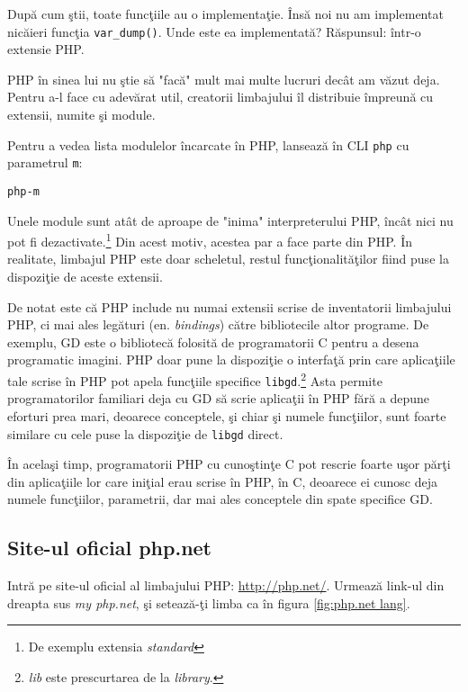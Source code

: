 După cum ştii, toate funcţiile au o implementaţie. Însă
noi nu am implementat nicăieri funcţia \texttt{var\_dump()}. Unde
este ea implementată? Răspunsul: într-o extensie PHP.

PHP în sinea lui nu ştie să "facă" mult mai multe lucruri decât
am văzut deja. Pentru a-l face cu adevărat util, creatorii
limbajului îl distribuie împreună cu extensii, numite şi module.

Pentru a vedea lista modulelor încarcate în PHP, lansează
în CLI \texttt{php} cu parametrul \texttt{\-m}:
\begin{alltt}
php -m\Return
\end{alltt}
Unele module sunt atât de aproape de "inima" interpreterului
PHP, încât nici nu pot fi dezactivate.\footnote{De exemplu
extensia \textit{standard}} Din acest motiv, acestea
par a face parte din PHP. În realitate, limbajul PHP
este doar scheletul, restul funcţionalităţilor
fiind puse la dispoziţie de aceste extensii.

De notat este că PHP include nu numai extensii scrise
de inventatorii limbajului PHP, ci mai ales legături
(en. \textsl{bindings})
către bibliotecile altor programe. De exemplu,
GD este o bibliotecă folosită de programatorii C
pentru a desena programatic imagini. PHP doar
pune la dispoziţie o interfaţă prin care aplicaţiile
tale scrise în PHP pot apela funcţiile specifice \texttt{libgd}.\footnote{\textit{lib}
este prescurtarea de la \textit{library}.}
Asta permite programatorilor familiari deja cu GD
să scrie aplicaţii în PHP fără a depune eforturi
prea mari, deoarece conceptele, şi chiar şi numele funcţiilor,
sunt foarte similare cu cele puse la dispoziţie de \texttt{libgd}
direct.

În acelaşi timp, programatorii PHP cu cunoştinţe C
pot rescrie foarte uşor părţi din aplicaţiile lor
care iniţial erau scrise în PHP, în C, deoarece
ei cunosc deja numele funcţiilor, parametrii,
dar mai ales conceptele din spate specifice 
GD.


\subsection{Site-ul oficial php.net}
Intră pe site-ul oficial al limbajului PHP: \url{http://php.net/}.
Urmează link-ul din dreapta sus \textit{my php.net}, şi setează-ţi
limba ca în figura \ref{fig:php.net lang}.


